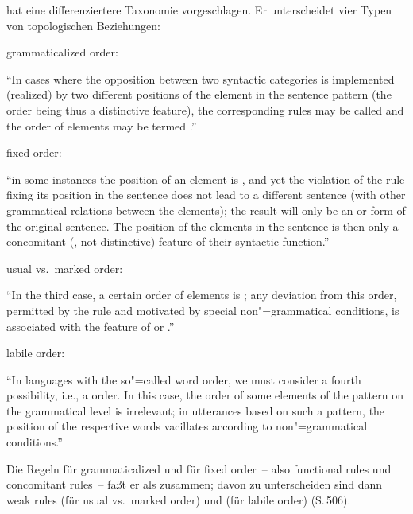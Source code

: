 \documentclass[output=paper]{langsci/langscibook}
\begin{document}
\ssubsection{}%
\label{subsec:1-1.2}
\citet{Danes1967} hat eine differenziertere Taxonomie vorgeschlagen. Er unterscheidet vier Typen von topologischen Beziehungen:
\begin{exe}
\ex\label{ex:1-1-2}
\begin{xlist}
\ex\label{ex:1-1-2a} grammaticalized order:

"`In cases where the opposition between two syntactic categories is implemented (realized) by two different positions of the element in the sentence
pattern (the order being thus a distinctive feature), the corresponding rules
may be called  and the order of elements may be termed
."' \citep[500f.]{Danes1967}

\ex\label{ex:1-1-2b} fixed order:

"`in some instances the position of an element is , and yet the violation
of the rule fixing its position in the sentence does not lead to a different sentence (with other grammatical relations between the elements); the result
will only be an  or  form of the original
sentence. The position of the elements in the sentence is then only a concomitant (, not distinctive) feature of their syntactic function."'
\citep[501]{Danes1967}

\ex\label{ex:1-1-2c} usual vs.\ marked order:

"`In the third case, a certain order of elements is ; any deviation from
this order, permitted by the  rule and motivated by special non"=grammatical conditions, is associated with the feature of  or ."' \citep[501]{Danes1967}

\ex\label{ex:1-1-2d} labile order:

"`In languages with the so"=called  word order, we must consider a
fourth possibility, i.e., a  order. In this case, the order of some elements of the pattern on the grammatical level is irrelevant; in utterances based
on such a pattern, the position of the respective words vacillates according
to non"=grammatical conditions."' \citep[501]{Danes1967}
\end{xlist}
\end{exe}
Die Regeln für grammaticalized und für fixed order~-- also functional
rules und concomitant rules~-- faßt er als  zusammen;
davon zu unterscheiden sind dann weak rules (für usual vs.\ marked
order) und  (für labile order) (S.\,506). 
\end{document}
